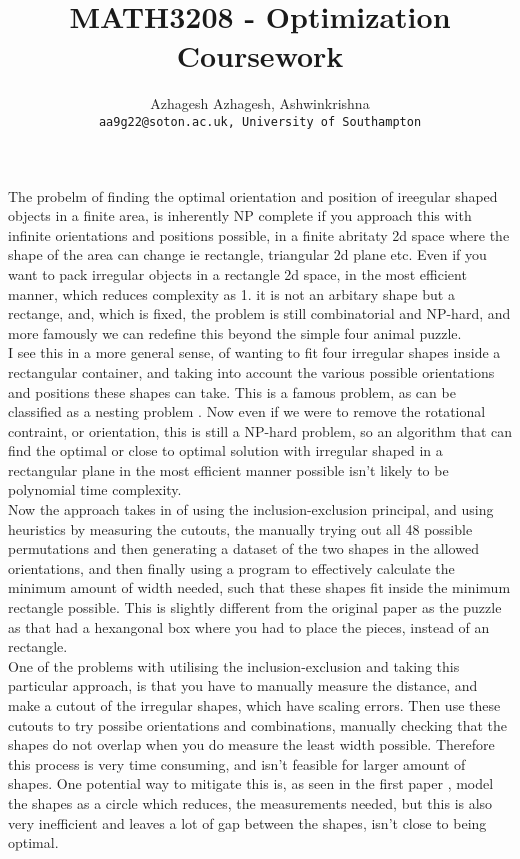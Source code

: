 \documentclass[a4paper]{article}
\title{MATH3208 - Optimization Coursework}
\author{Azhagesh
	Azhagesh, Ashwinkrishna\\
	\texttt{aa9g22@soton.ac.uk, University of Southampton}
}
\begin{document}
    \maketitle

    The probelm of finding the optimal orientation and position of ireegular shaped objects in a finite area, is inherently NP complete \cite{Nonregular} if you approach this with infinite orientations and positions possible, in a finite abritaty 2d space where the shape of the area can change ie rectangle, triangular 2d plane etc. Even if you want to pack irregular objects in a rectangle 2d space, in the most efficient manner, which reduces complexity as 1. it is not an arbitary shape but a rectange, and, which is fixed, the problem is still combinatorial and NP-hard, and more famously we can redefine this beyond the simple four animal puzzle.\\

    I see this in a more general sense, of wanting to fit four irregular shapes inside a rectangular container, and taking into account the various possible orientations and positions these shapes can take. This is a famous problem, as can be classified as a nesting problem \cite{irregular}. Now even if we were to remove the rotational contraint, or orientation, this is still a NP-hard problem, so an algorithm that can find the optimal or close to optimal solution with irregular shaped in a rectangular plane in the most efficient manner possible isn't likely to be polynomial time complexity.\\

    Now the approach takes in \cite{bismark} of using the inclusion-exclusion principal, and using heuristics by measuring the cutouts, the manually trying out all 48 possible permutations and then generating a dataset of the two shapes in the allowed orientations, and then finally using a program to effectively calculate the minimum amount of width needed, such that these shapes fit inside the minimum rectangle possible. This is slightly different from the original paper as the puzzle \cite{mongolia} as that had a hexangonal box where you had to place the pieces, instead of an rectangle.\\

    One of the problems with utilising the inclusion-exclusion and taking this particular approach, is that you have to manually measure the distance, and make a cutout of the irregular shapes, which have scaling errors. Then use these cutouts to try possibe orientations and combinations, manually checking that the shapes do not overlap when you do measure the least width possible. Therefore this process is very time consuming, and isn't feasible for larger amount of shapes. One potential way to mitigate this is, as seen in the first paper \cite{mongolia}, model the shapes as a circle which reduces, the measurements needed, but this is also very inefficient and leaves a lot of gap between the shapes, isn't close to being optimal.\\
\end{document}
